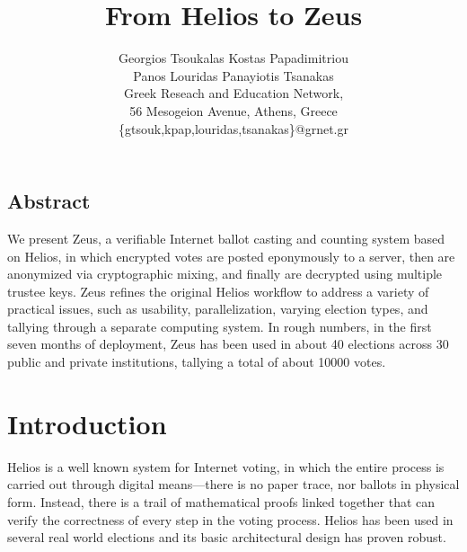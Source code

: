 \documentclass[letterpaper,10pt]{article}
\begin{document}
\date{}

\title{\Large \bf From Helios to Zeus}

\author{Georgios Tsoukalas \qquad  Kostas Papadimitriou\\ 
Panos Louridas \qquad Panayiotis Tsanakas\\[.5cm]
 Greek Reseach and Education Network,\\
56 Mesogeion Avenue, Athens, Greece\\
\{gtsouk,kpap,louridas,tsanakas\}@grnet.gr}


\maketitle

\thispagestyle{empty}

\subsection*{Abstract}

We present Zeus, a verifiable Internet ballot casting and counting
system based on Helios, in which encrypted votes are posted eponymously
to a server, then are anonymized via cryptographic mixing, and
finally are decrypted using multiple trustee keys. Zeus refines the
original Helios workflow to address a variety of practical issues, such
as usability, parallelization, varying election types, and tallying
through a separate computing system.
In rough numbers, in the first seven months of deployment, Zeus has been
used in about 40 elections across 30 public and private institutions,
tallying a total of about 10000 votes.


\section{Introduction}

Helios \cite{adida:2008} \cite{Helios3} is a well known system for
Internet voting, in which the entire process is carried out through
digital means---there is no paper trace, nor ballots in physical form.
Instead, there is a trail of mathematical proofs linked together that
can verify the correctness of every step in the voting process.
Helios has been used in several real world elections and its basic
architectural design has proven robust.
\end{document}
